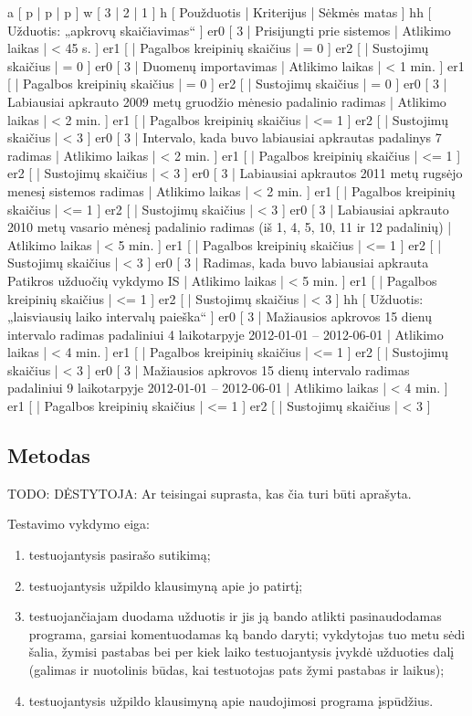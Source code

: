 \xtableu
{
  a [ p | p | p ]
  w [ 3 | 2 | 1 ]
  h [ Použduotis | Kriterijus | Sėkmės matas ]
  hh [ Užduotis: „apkrovų skaičiavimas“ ]
  er0 [ 3 | Prisijungti prie sistemos 
    | Atlikimo laikas | < 45 s. ]
  er1 [ 
    | Pagalbos kreipinių skaičius | = 0 ]
  er2 [ 
    | Sustojimų skaičius | = 0 ]
  er0 [ 3 | Duomenų importavimas 
    | Atlikimo laikas | < 1 min. ]
  er1 [
    | Pagalbos kreipinių skaičius | = 0 ]
  er2 [ 
    | Sustojimų skaičius | = 0 ]
  er0 [ 3 | Labiausiai apkrauto 2009 metų gruodžio mėnesio padalinio radimas 
    | Atlikimo laikas | < 2 min. ]
  er1 [
    | Pagalbos kreipinių skaičius | <= 1 ]
  er2 [ 
    | Sustojimų skaičius | < 3 ]
  er0 [ 3 | Intervalo, kada buvo labiausiai apkrautas padalinys 7 radimas 
    | Atlikimo laikas | < 2 min. ]
  er1 [
    | Pagalbos kreipinių skaičius | <= 1 ]
  er2 [ 
    | Sustojimų skaičius | < 3 ]
  er0 [ 3 | Labiausiai apkrautos 2011 metų rugsėjo menesį sistemos radimas 
         | Atlikimo laikas | < 2 min. ]
  er1 [ | Pagalbos kreipinių skaičius | <= 1 ]
  er2 [ | Sustojimų skaičius | < 3 ]
  er0 [ 3 | Labiausiai apkrauto 2010 metų vasario mėnesį padalinio radimas
      (iš 1, 4, 5, 10, 11 ir 12 padalinių) 
    | Atlikimo laikas | < 5 min. ]
  er1 [
    | Pagalbos kreipinių skaičius | <= 1 ]
  er2 [ 
    | Sustojimų skaičius | < 3 ]
  er0 [ 3 | Radimas, kada buvo labiausiai apkrauta Patikros užduočių vykdymo IS 
    | Atlikimo laikas | < 5 min. ]
  er1 [
    | Pagalbos kreipinių skaičius | <= 1 ]
  er2 [ 
    | Sustojimų skaičius | < 3 ]
  hh [ Užduotis: „laisviausių laiko intervalų paieška“ ]
  er0 [ 3 | Mažiausios apkrovos 15 dienų intervalo radimas padaliniui 
      4 laikotarpyje 2012-01-01 – 2012-06-01 
    | Atlikimo laikas | < 4 min. ]
  er1 [
    | Pagalbos kreipinių skaičius | <= 1 ]
  er2 [ 
    | Sustojimų skaičius | < 3 ]
  er0 [ 3 | Mažiausios apkrovos 15 dienų intervalo radimas padaliniui 
      9 laikotarpyje 2012-01-01 – 2012-06-01 
    | Atlikimo laikas | < 4 min. ]
  er1 [
    | Pagalbos kreipinių skaičius | <= 1 ]
  er2 [ 
    | Sustojimų skaičius | < 3 ]
}

\subsection{Metodas}

TODO: DĖSTYTOJA: Ar teisingai suprasta, kas čia turi būti aprašyta.

Testavimo vykdymo eiga:
\begin{enumerate}
  \item testuojantysis pasirašo sutikimą;
  \item testuojantysis užpildo klausimyną apie jo patirtį;
  \item testuojančiajam duodama užduotis ir jis ją bando atlikti
    pasinaudodamas programa, garsiai komentuodamas ką bando daryti;
    vykdytojas tuo metu sėdi šalia, žymisi pastabas bei per kiek
    laiko testuojantysis įvykdė užduoties dalį (galimas ir nuotolinis
    būdas, kai testuotojas pats žymi pastabas ir laikus);
  \item testuojantysis užpildo klausimyną apie naudojimosi programa
    įspūdžius.
\end{enumerate}

